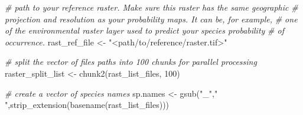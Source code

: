\documentclass[
]{article}
\newenvironment{Shaded}{\begin{snugshade}}{\end{snugshade}}
\newcommand{\CommentTok}[1]{\textcolor[rgb]{0.56,0.35,0.01}{\textit{#1}}}
\newcommand{\DecValTok}[1]{\textcolor[rgb]{0.00,0.00,0.81}{#1}}
\newcommand{\FunctionTok}[1]{\textcolor[rgb]{0.00,0.00,0.00}{#1}}
\newcommand{\NormalTok}[1]{#1}
\newcommand{\OtherTok}[1]{\textcolor[rgb]{0.56,0.35,0.01}{#1}}
\newcommand{\StringTok}[1]{\textcolor[rgb]{0.31,0.60,0.02}{#1}}
\begin{document}
\begin{Shaded}
\begin{Highlighting}[]
\CommentTok{\# path to your reference raster. Make sure this raster has the same geographic }
\CommentTok{\# projection and resolution as your probability maps. It can be, for example, }
\CommentTok{\# one of the environmental raster layer used to predict your species probability}
\CommentTok{\# of occurrence.}
\NormalTok{rast\_ref\_file }\OtherTok{\textless{}{-}} \StringTok{"\textless{}path/to/reference/raster.tif\textgreater{}"} 

\CommentTok{\# split the vector of files paths into 100 chunks for parallel processing}
\NormalTok{raster\_split\_list }\OtherTok{\textless{}{-}} \FunctionTok{chunk2}\NormalTok{(rast\_list\_files, }\DecValTok{100}\NormalTok{)}

\CommentTok{\# create a vector of species names}
\NormalTok{sp.names }\OtherTok{\textless{}{-}} \FunctionTok{gsub}\NormalTok{(}\StringTok{"\_"}\NormalTok{,}\StringTok{" "}\NormalTok{,}\FunctionTok{strip\_extension}\NormalTok{(}\FunctionTok{basename}\NormalTok{(rast\_list\_files)))}


\end{Highlighting}
\end{Shaded}
\end{document}

